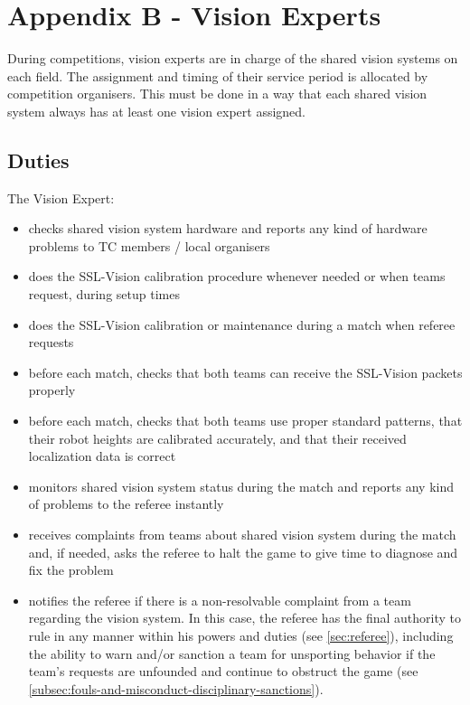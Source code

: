 \section{Appendix B - Vision Experts}\label{app:vision-experts}

During competitions, vision experts are in charge of the shared vision systems on each field.
The assignment and timing of their service period is allocated by competition organisers.
This must be done in a way that each shared vision system always has at least one vision expert assigned.

\subsection{Duties}
The Vision Expert:
\begin{itemize}
\item checks shared vision system hardware and reports any kind of hardware problems to TC members / local organisers
\item does the SSL-Vision calibration procedure whenever needed or when teams request, during setup times
\item does the SSL-Vision calibration or maintenance during a match when referee requests
\item before each match, checks that both teams can receive the SSL-Vision packets properly
\item before each match, checks that both teams use proper standard patterns, that their robot heights are calibrated accurately, and that their received localization data is correct
\item monitors shared vision system status during the match and reports any kind of problems to the referee instantly
\item receives complaints from teams about shared vision system during the match and, if needed, asks the referee to halt the game to give time to diagnose and fix the problem
\item notifies the referee if there is a non-resolvable complaint from a team regarding the vision system.
In this case, the referee has the final authority to rule in any manner within his powers and duties (see \autoref{sec:referee}), including the ability to warn and/or sanction a team for unsporting behavior if the team's requests are unfounded and continue to obstruct the game (see \autoref{subsec:fouls-and-misconduct-disciplinary-sanctions}).
\end{itemize}
